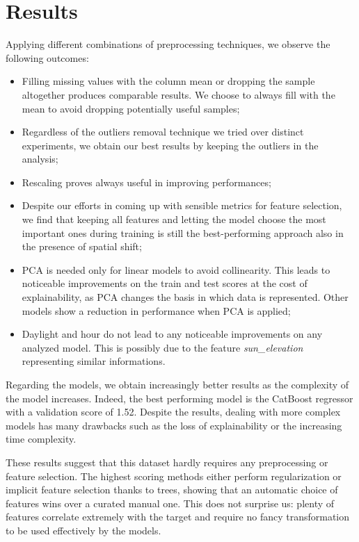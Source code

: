\documentclass{article}
\begin{document}
\begin{table}[t]
\begin{tabular}{p{2cm}p{4.5cm}p{1.8cm}p{2cm}}
\bottomrule
\end{tabular}
\label{table:hypTest}
\end{table}
\section{Results}
Applying different combinations of preprocessing techniques, we observe the following outcomes:

\begin{itemize} 
    \item Filling missing values with the column mean or dropping the sample altogether produces comparable results. We choose to always fill with the mean to avoid dropping potentially useful samples;
    \item Regardless of the outliers removal technique we tried over distinct experiments, we obtain our best results by keeping the outliers in the analysis;
    \item Rescaling proves always useful in improving performances;
    \item Despite our efforts in coming up with sensible metrics for feature selection, we find that keeping all features and letting the model choose the most important ones during training is still the best-performing approach also in the presence of spatial shift;
    \item PCA is needed only for linear models to avoid collinearity. This leads to noticeable improvements on the train and test scores at the cost of explainability, as PCA changes the basis in which data is represented. Other models show a reduction in performance when PCA is applied;
    \item Daylight and hour do not lead to any noticeable improvements on any analyzed model. This is possibly due to the feature \textit{sun\_elevation} representing similar informations.
\end{itemize} 

Regarding the models, we obtain increasingly better results as the complexity of the model increases. Indeed, the best performing model is the CatBoost regressor with a validation score of 1.52. Despite the results, dealing with more complex models has many drawbacks such as the loss of explainability or the increasing time complexity.

These results suggest that this dataset hardly requires any preprocessing or feature selection. The highest scoring methods either perform regularization or implicit feature selection thanks to trees, showing that an automatic choice of features wins over a curated manual one. This does not surprise us: plenty of features correlate extremely with the target and require no fancy transformation to be used effectively by the models.
\end{document}

